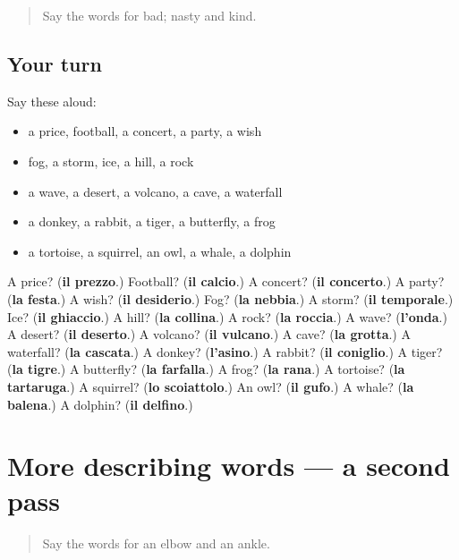 \begin{quote}
Say the words for bad; nasty and kind.
\end{quote}

\subsection*{Your turn}
Say these aloud:

\begin{itemize}
\raggedright
  \item a price, football, a concert, a party, a wish
  \item fog, a storm, ice, a hill, a rock
  \item a wave, a desert, a volcano, a cave, a waterfall
  \item a donkey, a rabbit, a tiger, a butterfly, a frog
  \item a tortoise, a squirrel, an owl, a whale, a dolphin
\end{itemize}

\begin{tcolorbox}[breakable,colback=teal!4,colframe=teal!35!black,title={Before you move on}]
A price? (\textbf{il prezzo}.) Football? (\textbf{il calcio}.) A concert? (\textbf{il concerto}.) A party? (\textbf{la festa}.) A wish? (\textbf{il desiderio}.) Fog? (\textbf{la nebbia}.) A storm? (\textbf{il temporale}.) Ice? (\textbf{il ghiaccio}.) A hill? (\textbf{la collina}.) A rock? (\textbf{la roccia}.) A wave? (\textbf{l'onda}.) A desert? (\textbf{il deserto}.) A volcano? (\textbf{il vulcano}.) A cave? (\textbf{la grotta}.) A waterfall? (\textbf{la cascata}.) A donkey? (\textbf{l'asino}.) A rabbit? (\textbf{il coniglio}.) A tiger? (\textbf{la tigre}.) A butterfly? (\textbf{la farfalla}.) A frog? (\textbf{la rana}.) A tortoise? (\textbf{la tartaruga}.) A squirrel? (\textbf{lo scoiattolo}.) An owl? (\textbf{il gufo}.) A whale? (\textbf{la balena}.) A dolphin? (\textbf{il delfino}.)
\end{tcolorbox}
\section[(dialogue)]{More describing words — a second pass}

\label{lesson:IT-R126-second-pass-more-describing-words}



\begin{quote}
Say the words for an elbow and an ankle.
\end{quote}

